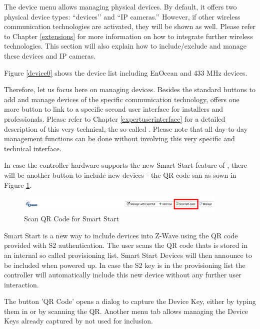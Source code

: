 The device menu allows managing physical devices. By default, it offers two physical 
device types: ``\zwave devices’’ and ``IP cameras.’’ However, if other wireless communication 
technologies are activated, they will be shown as well. Please refer to 
Chapter \ref{extensions} for more information on how to integrate further 
wireless technologies.   This section will also explain how to include/exclude and manage 
these devices and IP cameras.

Figure \ref{device0} shows the device list including EnOcean and 433 MHz devices.

Therefore, let us focus here on managing \zwave devices. Besides the standard buttons 
to add and manage devices of the specific communication technology, \zwave offers one
 more button to link to a specific second \zwave user interface for installers and professionals.
Please refer to Chapter \ref{expertuserinterface} for a detailed description of this very 
technical, the so-called \zweui. Please note that all day-to-day management functions 
can be done without involving this very specific and technical interface.

In case the controller hardware supports the new Smart Start feature of \zwave, there will be 
another button to include new devices - the QR code san as sown in Figure \ref{shui-ss1}.

\begin{figure}
\begin{center}
\includegraphics[width=0.9\textwidth]{pngs/cap4/shui-ss1.png}
\caption{Scan QR Code for Smart Start}
\label{shui-ss1}
\end{center}
\end{figure}

Smart Start is a new way to include devices into Z-Wave using the QR code 
provided with S2 authentication.  The user scans the QR code thats is stored in an internal 
so called  provisioning list. Smart Start Devices will then announce to be included when 
powered up. In case the S2 key is in the provisioning list the controller will automatically 
include  this new device without any further user interaction.

The button 'QR Code' opens a dialog to capture the Device Key, either by 
typing them in or by scanning the QR. Another menu tab allows managing the Device Keys 
already captured by not used for inclusion.

